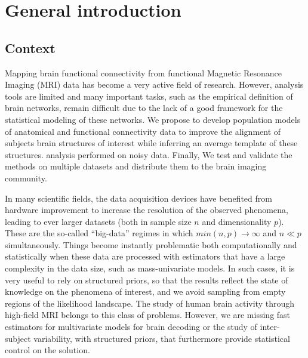 \chapter{General introduction}
\label{chap:intro}

\minitoc

\section{Context}
Mapping brain functional connectivity from functional Magnetic Resonance Imaging (MRI) data has become
a very active field of research. However, analysis tools are limited and many important tasks, such as the empirical
definition of brain networks, remain difficult due to the lack of a good framework for the statistical
modeling of these networks. We propose to develop population models of anatomical and functional connectivity
data to improve the alignment of subjects brain structures of interest while inferring an average template
of these structures. %
analysis performed on noisy data. Finally,
We test and validate the methods on multiple datasets and
distribute them to the brain imaging community.

In many scientific fields, the data acquisition devices have benefited from hardware improvement to increase the resolution of the observed phenomena, leading to ever larger datasets (both in sample size $n$ and dimensionality $p$). These are the so-called ``big-data'' regimes in which
$min(n, p) \rightarrow \infty$  and $n \ll p$ simultaneously.
Things become instantly problematic both computationally and statistically when these
data are processed with estimators that have a large complexity in the data size, such as
mass-univariate models.
In such cases, it is very useful to rely on structured priors, so that the results reflect the state of knowledge on the phenomena of interest, and we avoid sampling from empty regions of the likelihood landscape. The study of human brain activity through high-field MRI belongs to
this class of problems.
However, we are missing fast estimators for multivariate models for brain decoding or the study of inter-subject variability,  with structured priors, that furthermore provide statistical control on the solution.

